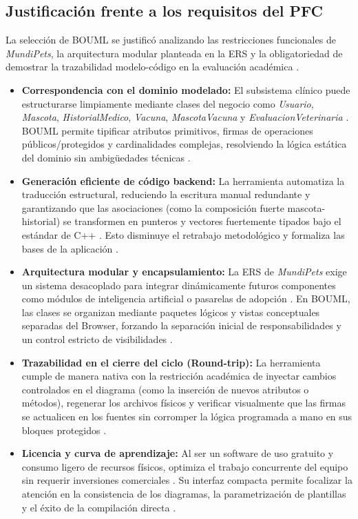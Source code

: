 \documentclass[journal,onecolumn]{IEEEtran}
\begin{document}
	\subsection{Justificación frente a los requisitos del PFC}
	La selección de BOUML se justificó analizando las restricciones funcionales de \textit{MundiPets}, la arquitectura modular planteada en la ERS y la obligatoriedad de demostrar la trazabilidad modelo-código en la evaluación académica \cite{GuiaMDD2026, ERSMundiPets2026}.
	\begin{itemize}
		\item \textbf{Correspondencia con el dominio modelado:} El subsistema clínico puede estructurarse limpiamente mediante clases del negocio como \textit{Usuario}, \textit{Mascota}, \textit{HistorialMedico}, \textit{Vacuna}, \textit{MascotaVacuna} y \textit{EvaluacionVeterinaria} \cite{ERSMundiPets2026}. BOUML permite tipificar atributos primitivos, firmas de operaciones públicos/protegidos y cardinalidades complejas, resolviendo la lógica estática del dominio sin ambigüedades técnicas \cite{BOUMLFeatures2026}.
		\item \textbf{Generación eficiente de código backend:} La herramienta automatiza la traducción estructural, reduciendo la escritura manual redundante y garantizando que las asociaciones (como la composición fuerte mascota-historial) se transformen en punteros y vectores fuertemente tipados bajo el estándar de C++ \cite{BOUMLFeatures2026}. Esto disminuye el retrabajo metodológico y formaliza las bases de la aplicación \cite{Durai2022XMI}.
		\item \textbf{Arquitectura modular y encapsulamiento:} La ERS de \textit{MundiPets} exige un sistema desacoplado para integrar dinámicamente futuros componentes como módulos de inteligencia artificial o pasarelas de adopción \cite{ERSMundiPets2026}. En BOUML, las clases se organizan mediante paquetes lógicos y vistas conceptuales separadas del Browser, forzando la separación inicial de responsabilidades y un control estricto de visibilidades \cite{BOUMLFeatures2026}.
		\item \textbf{Trazabilidad en el cierre del ciclo (Round-trip):} La herramienta cumple de manera nativa con la restricción académica de inyectar cambios controlados en el diagrama (como la inserción de nuevos atributos o métodos), regenerar los archivos físicos y verificar visualmente que las firmas se actualicen en los fuentes sin corromper la lógica programada a mano en sus bloques protegidos \cite{BOUMLFeatures2026, GuiaMDD2026}.
		\item \textbf{Licencia y curva de aprendizaje:} Al ser un software de uso gratuito y consumo ligero de recursos físicos, optimiza el trabajo concurrente del equipo sin requerir inversiones comerciales \cite{BOUML2025}. Su interfaz compacta permite focalizar la atención en la consistencia de los diagramas, la parametrización de plantillas y el éxito de la compilación directa \cite{BOUMLFeatures2026}.
	\end{itemize}
	
\end{document}
